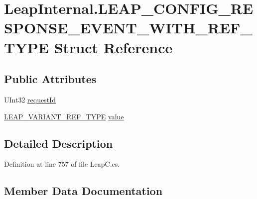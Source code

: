 \hypertarget{struct_leap_internal_1_1_l_e_a_p___c_o_n_f_i_g___r_e_s_p_o_n_s_e___e_v_e_n_t___w_i_t_h___r_e_f___t_y_p_e}{}\section{Leap\+Internal.\+L\+E\+A\+P\+\_\+\+C\+O\+N\+F\+I\+G\+\_\+\+R\+E\+S\+P\+O\+N\+S\+E\+\_\+\+E\+V\+E\+N\+T\+\_\+\+W\+I\+T\+H\+\_\+\+R\+E\+F\+\_\+\+T\+Y\+PE Struct Reference}
\label{struct_leap_internal_1_1_l_e_a_p___c_o_n_f_i_g___r_e_s_p_o_n_s_e___e_v_e_n_t___w_i_t_h___r_e_f___t_y_p_e}
\subsection*{Public Attributes}
\begin{DoxyCompactItemize}
\item 
U\+Int32 \mbox{\hyperlink{struct_leap_internal_1_1_l_e_a_p___c_o_n_f_i_g___r_e_s_p_o_n_s_e___e_v_e_n_t___w_i_t_h___r_e_f___t_y_p_e_a88e9acc56f20cfc18f551b96a1601209}{request\+Id}}
\item 
\mbox{\hyperlink{struct_leap_internal_1_1_l_e_a_p___v_a_r_i_a_n_t___r_e_f___t_y_p_e}{L\+E\+A\+P\+\_\+\+V\+A\+R\+I\+A\+N\+T\+\_\+\+R\+E\+F\+\_\+\+T\+Y\+PE}} \mbox{\hyperlink{struct_leap_internal_1_1_l_e_a_p___c_o_n_f_i_g___r_e_s_p_o_n_s_e___e_v_e_n_t___w_i_t_h___r_e_f___t_y_p_e_a1b2461e60b8b53f07120c631cff55c81}{value}}
\end{DoxyCompactItemize}


\subsection{Detailed Description}


Definition at line 757 of file Leap\+C.\+cs.



\subsection{Member Data Documentation}
\mbox{\label{struct_leap_internal_1_1_l_e_a_p___c_o_n_f_i_g___r_e_s_p_o_n_s_e___e_v_e_n_t___w_i_t_h___r_e_f___t_y_p_e_a88e9acc56f20cfc18f551b96a1601209}} 
